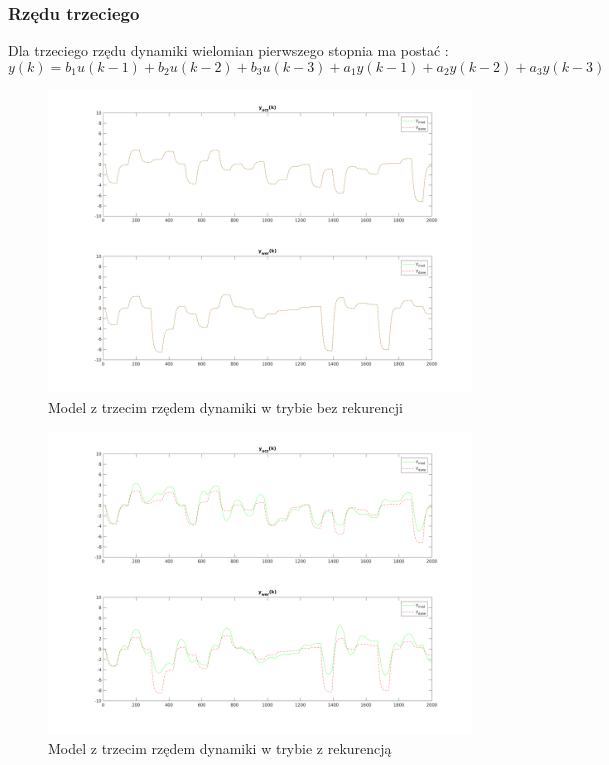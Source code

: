 \documentclass[a4paper, 11pt]{article}
\begin{document}
\subsubsection{Rzędu trzeciego}
Dla trzeciego rzędu dynamiki wielomian pierwszego stopnia ma postać : 
$$y(k) = b_1u(k-1)+b_2u(k-2)+b_3u(k-3) + a_1y(k-1)+a_2y(k-2)+a_3y(k-3)$$
\begin{figure}[H]
\centering
\includegraphics[scale=0.50]{dane_dyn_mod_brek_D_3N_1.png}
\caption{Model z trzecim rzędem dynamiki w trybie bez rekurencji }
\label{}
\end{figure}
\begin{figure}[H]
\centering
\includegraphics[scale=0.50]{dane_dyn_mod_rek_D_3N_1.png}
\caption{Model z trzecim rzędem dynamiki w trybie z rekurencją }
\label{}
\end{figure}
\end{document}
